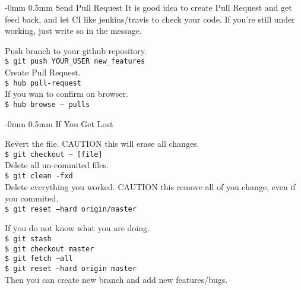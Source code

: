 \documentclass[10pt,landscape]{article}
\makeatletter
\renewcommand{\section}{\@startsection{section}{1}{0mm}%
                                {-0mm} %
                                {0.5mm}%
                                {\normalfont\large\bfseries}}
\makeatother
\begin{document}
\begin{multicols}{2}
\section{Send Pull Request}
\vspace{2.5mm}
It is good idea to create Pull Request and get
feed back, and let CI like jenkins/travis to check your code.
If you're still under working, just write so in the message.
\begin{tabbing}
Pu\=sh branch to your github repository.\\
\> \texttt{\$ git push YOUR\_USER new\_features}\\  
Create Pull Request.\\
\> \texttt{\$ hub pull-request}\\  
If you wan to confirm on browser.\\
\> \texttt{\$ hub browse -- pulls}\\  
\end{tabbing}

\vspace{-2.5mm}
\section{If You Get Lost}

\vspace{2.5mm}
\begin{tabbing}
Re\=vert the file. CAUTION this will erase all changes.\\
\> \texttt{\$ git checkout -- [file]}\\
Delete all un-commited files.\\
\> \texttt{\$ git clean -fxd}\\
Delete everything you worked. CAUTION this remove all of
you change, even if you commited.\\
\> \texttt{\$ git reset --hard origin/master}\\
\end{tabbing}

\begin{tabbing}
If \=you do not know what you are doing.\\
\> \texttt{\$ git stash}\\
\> \texttt{\$ git checkout master}\\
\> \texttt{\$ git fetch --all}\\
\> \texttt{\$ git reset --hard origin master}\\
Then you can create new branch and add new features/bugs.
\end{tabbing}


\end{multicols}
\end{document}
